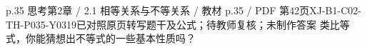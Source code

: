 \par\noindent\begin{minipage}{\linewidth}
\begin{bankitem}{p.35 思考}{第2章 / 2.1 相等关系与不等关系 / 教材 p.35 / PDF 第42页}{XJ-B1-C02-TH-P035-Y0319}{已对照原页转写题干及公式；待教师复核；未制作答案}
类比等式，你能猜想出不等式的一些基本性质吗？
\end{bankitem}
\end{minipage}\par\medskip
